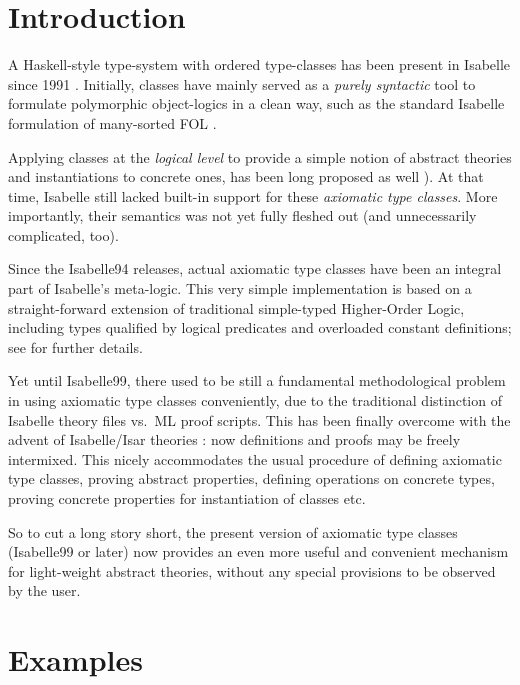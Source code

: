 
\chapter{Introduction}

A Haskell-style type-system \cite{haskell-report} with ordered type-classes
has been present in Isabelle since 1991 \cite{nipkow-sorts93}.  Initially,
classes have mainly served as a \emph{purely syntactic} tool to formulate
polymorphic object-logics in a clean way, such as the standard Isabelle
formulation of many-sorted FOL \cite{paulson-isa-book}.

Applying classes at the \emph{logical level} to provide a simple notion of
abstract theories and instantiations to concrete ones, has been long proposed
as well \cite{nipkow-types93,nipkow-sorts93}).  At that time, Isabelle still
lacked built-in support for these \emph{axiomatic type classes}. More
importantly, their semantics was not yet fully fleshed out (and unnecessarily
complicated, too).

Since the Isabelle94 releases, actual axiomatic type classes have been an
integral part of Isabelle's meta-logic.  This very simple implementation is
based on a straight-forward extension of traditional simple-typed Higher-Order
Logic, including types qualified by logical predicates and overloaded constant
definitions; see \cite{Wenzel:1997:TPHOL} for further details.

Yet until Isabelle99, there used to be still a fundamental methodological
problem in using axiomatic type classes conveniently, due to the traditional
distinction of Isabelle theory files vs.\ ML proof scripts.  This has been
finally overcome with the advent of Isabelle/Isar theories
\cite{isabelle-isar-ref}: now definitions and proofs may be freely intermixed.
This nicely accommodates the usual procedure of defining axiomatic type
classes, proving abstract properties, defining operations on concrete types,
proving concrete properties for instantiation of classes etc.

\medskip

So to cut a long story short, the present version of axiomatic type classes
(Isabelle99 or later) now provides an even more useful and convenient
mechanism for light-weight abstract theories, without any special provisions
to be observed by the user.


\chapter{Examples}\label{sec:ex}

